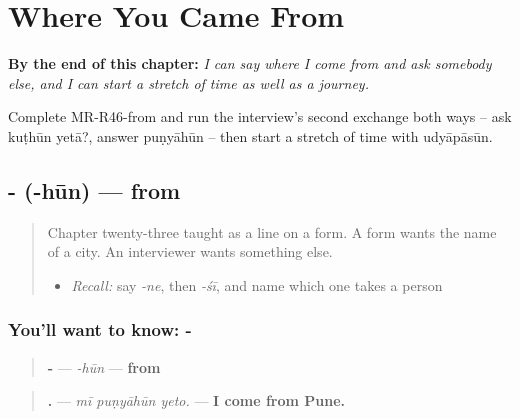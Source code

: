 
\chapter{Where You Came From}
\label{ch:mr-from}

\begin{chapteropening}
\textbf{By the end of this chapter:} \emph{I can say where I come from and ask somebody else, and I can start a stretch of time as well as a journey.}

Complete MR-R46-from and run the interview's second exchange both ways -- ask kuṭhūn yetā?, answer puṇyāhūn -- then start a stretch of time with udyāpāsūn.
\end{chapteropening}

\section[\texorpdfstring{-\mr{हून} (-hūn)}{-हून (-hūn)}]{- (-hūn) — from}

\label{lesson:MR-C46-huun}



\begin{quote}
Chapter twenty-three taught \textbf{} as a line on a form. A form wants the name of a city. An interviewer wants something else.

\begin{itemize}
\raggedright
  \item \emph{Recall:} say \emph{-ne}, then \emph{-śī}, and name which one takes a person
\end{itemize}
\end{quote}

\subsection*{You'll want to know: -}
\begin{quote}
\textbf{-} — \emph{-hūn} — \textbf{from}
\end{quote}

\begin{quote}
\textbf{  .} — \emph{mī puṇyāhūn yeto.} — \textbf{I come from Pune.}
\end{quote}

